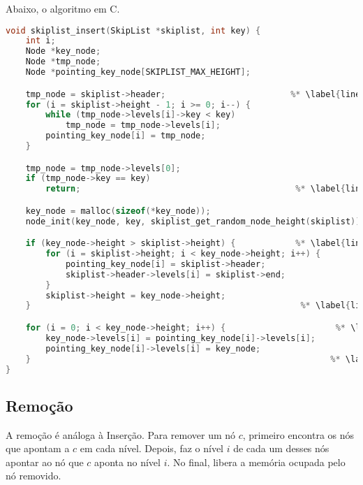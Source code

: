 \documentclass[paper=a4, fontsize=11pt]{scrartcl} %
\numberwithin{equation}{section}
\numberwithin{figure}{section}
\numberwithin{table}{section}
\numberwithin{definition}{section}
\numberwithin{theorem}{section}
\numberwithin{property}{section}
\numberwithin{proposition}{section}
\begin{document}
Abaixo, o algoritmo em C. 

\begin{lstlisting}[caption=Inserção., language=C]
void skiplist_insert(SkipList *skiplist, int key) {
    int i;
    Node *key_node;
    Node *tmp_node;
    Node *pointing_key_node[SKIPLIST_MAX_HEIGHT];

    tmp_node = skiplist->header;                         %* \label{line:ins_beg_p1} *)
    for (i = skiplist->height - 1; i >= 0; i--) {
        while (tmp_node->levels[i]->key < key)
            tmp_node = tmp_node->levels[i];
        pointing_key_node[i] = tmp_node;
    }                                                    

    tmp_node = tmp_node->levels[0];
    if (tmp_node->key == key)
        return;                                           %* \label{line:ins_end_p1} *)

    key_node = malloc(sizeof(*key_node));
    node_init(key_node, key, skiplist_get_random_node_height(skiplist));

    if (key_node->height > skiplist->height) {            %* \label{line:ins_beg_p2} *)
        for (i = skiplist->height; i < key_node->height; i++) {
            pointing_key_node[i] = skiplist->header;
            skiplist->header->levels[i] = skiplist->end;
        }
        skiplist->height = key_node->height;
    }                                                      %* \label{line:ins_end_p2} *)

    for (i = 0; i < key_node->height; i++) {                      %* \label{line:ins_beg_p3} *)
        key_node->levels[i] = pointing_key_node[i]->levels[i];
        pointing_key_node[i]->levels[i] = key_node;
    }                                                            %* \label{line:ins_end_p3} *)
}
\end{lstlisting}

\subsection{Remoção}

A remoção é análoga à Inserção. Para remover um nó $c$, primeiro encontra os nós que apontam a
$c$ em cada nível. Depois, faz o nível $i$ de cada um desses nós apontar ao nó que $c$ aponta no nível $i$.
No final, libera a memória ocupada pelo nó removido.
\end{document}
